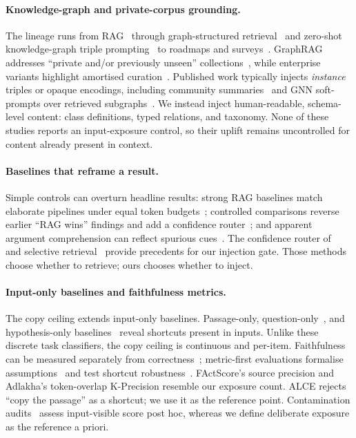 \documentclass[10pt,twocolumn]{article}
\begin{document}
\paragraph{Knowledge-graph and private-corpus grounding.}
The lineage runs from RAG~\cite{lewis2020rag} through graph-structured retrieval~\cite{edge2024graphrag,guo2024lightrag} and zero-shot knowledge-graph triple prompting~\cite{baek2023kaping} to roadmaps and surveys~\cite{pan2024unifying,peng2024graphragsurvey}. GraphRAG addresses ``private and/or previously unseen'' collections~\cite{edge2024graphrag}, while enterprise variants highlight amortised curation~\cite{jiang2025practicalgraphrag}. Published work typically injects \emph{instance} triples or opaque encodings, including community summaries~\cite{edge2024graphrag} and GNN soft-prompts over retrieved subgraphs~\cite{he2024gretriever}. We instead inject human-readable, schema-level content: class definitions, typed relations, and taxonomy. None of these studies reports an input-exposure control, so their uplift remains uncontrolled for content already present in context.

\paragraph{Baselines that reframe a result.}
Simple controls can overturn headline results: strong RAG baselines match elaborate pipelines under equal token budgets~\cite{laitenberger2025stronger}; controlled comparisons reverse earlier ``RAG wins'' findings and add a confidence router~\cite{li2024ragorlongcontext}; and apparent argument comprehension can reflect spurious cues~\cite{niven2019probing}. The confidence router of~\textcite{li2024ragorlongcontext} and selective retrieval~\cite{asai2024selfrag,jeong2024adaptiverag,mallen2023trust} provide precedents for our injection gate. Those methods choose whether to retrieve; ours chooses whether to inject.

\paragraph{Input-only baselines and faithfulness metrics.}
The copy ceiling extends input-only baselines. Passage-only, question-only~\cite{kaushik2018reading}, and hypothesis-only baselines~\cite{gururangan2018artifacts,poliak2018hypothesis} reveal shortcuts present in inputs. Unlike these discrete task classifiers, the copy ceiling is continuous and per-item. Faithfulness can be measured separately from correctness~\cite{es2023ragas,adlakha2024evaluating,zhou2023contextfaithful}; metric-first evaluations formalise assumptions~\cite{min2023factscore} and test shortcut robustness~\cite{gao2023alce}. FActScore's source precision and Adlakha's token-overlap K-Precision resemble our exposure count. ALCE rejects ``copy the passage'' as a shortcut; we use it as the reference point. Contamination audits~\cite{sainz2023contamination,golchin2024timetravel} assess input-visible score post hoc, whereas we define deliberate exposure as the reference a priori.
\end{document}
